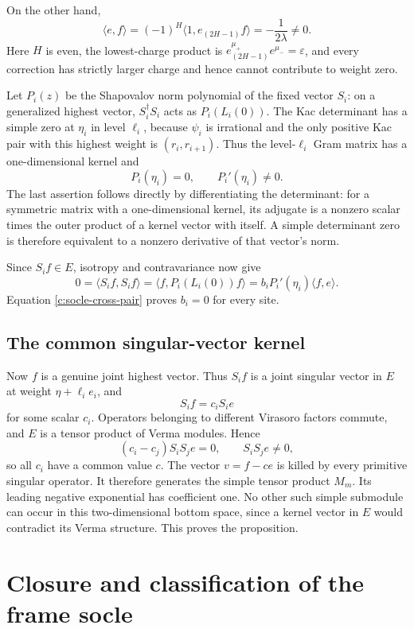 \documentclass[11pt,a4paper]{article}
\numberwithin{equation}{section}
\theoremstyle{definition}\newtheorem{definition}[theorem]{Definition}
\theoremstyle{remark}\newtheorem{remark}[theorem]{Remark}
\begin{document}
On the other hand,
\begin{equation}\label{c:socle-cross-pair}
 \langle e,f\rangle=(-1)^H\langle1,e_{(2H-1)}f\rangle
                  =-\frac1{2\lambda}\ne0.
\end{equation}
Here $H$ is even, the lowest-charge product is
$e^{\mu_+}_{(2H-1)}e^{\mu_-}=\varepsilon$, and every correction has
strictly larger charge and hence cannot contribute to weight zero.

Let $P_i(z)$ be the Shapovalov norm polynomial of the fixed vector
$S_i$: on a generalized highest vector, $S_i^\dagger S_i$ acts as
$P_i(L_i(0))$.  The Kac determinant has a simple zero at $\eta_i$ in
level $\ell_i$, because $\psi_i$ is irrational and the only positive
Kac pair with this highest weight is $(r_i,r_{i+1})$.
Thus the level-$\ell_i$ Gram matrix has a one-dimensional kernel and
\[
 P_i(\eta_i)=0,\qquad P_i'(\eta_i)\ne0.
\]
The last assertion follows directly by differentiating the determinant:
for a symmetric matrix with a one-dimensional kernel, its adjugate is
a nonzero scalar times the outer product of a kernel vector with
itself.  A simple determinant zero is therefore equivalent to a
nonzero derivative of that vector's norm.

Since $S_i f\in E$, isotropy and contravariance now give
\[
 0=\langle S_i f,S_i f\rangle
   =\langle f,P_i(L_i(0))f\rangle
   =b_iP_i'(\eta_i)\langle f,e\rangle.
\]
Equation \eqref{c:socle-cross-pair} proves $b_i=0$ for every site.

\subsection*{The common singular-vector kernel}
Now $f$ is a genuine joint highest vector.  Thus $S_i f$ is a joint
singular vector in $E$ at weight $\eta+\ell_i e_i$, and
\[
 S_i f=c_i S_i e
\]
for some scalar $c_i$.  Operators belonging to different Virasoro
factors commute, and $E$ is a tensor product of Verma modules.  Hence
\[
 (c_i-c_j)S_iS_j e=0,\qquad S_iS_j e\ne0,
\]
so all $c_i$ have a common value $c$.  The vector $v=f-ce$ is killed
by every primitive singular operator.  It therefore generates the
simple tensor product $M_m$.  Its leading negative exponential has
coefficient one.  No other such simple submodule can occur in this
two-dimensional bottom space, since a kernel vector in $E$ would
contradict its Verma structure.  This proves the proposition.


\section{Closure and classification of the frame socle}
\end{document}
